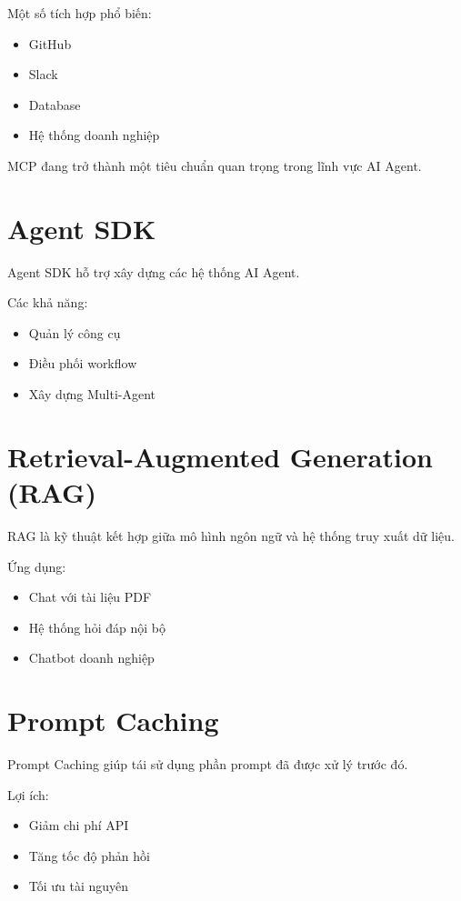 \documentclass[12pt]{article}
\begin{document}
Một số tích hợp phổ biến:

\begin{itemize}
    \item GitHub
    \item Slack
    \item Database
    \item Hệ thống doanh nghiệp
\end{itemize}

MCP đang trở thành một tiêu chuẩn quan trọng trong lĩnh vực AI Agent.

\section{Agent SDK}

Agent SDK hỗ trợ xây dựng các hệ thống AI Agent.

Các khả năng:

\begin{itemize}
    \item Quản lý công cụ
    \item Điều phối workflow
    \item Xây dựng Multi-Agent
\end{itemize}

\section{Retrieval-Augmented Generation (RAG)}

RAG là kỹ thuật kết hợp giữa mô hình ngôn ngữ và hệ thống truy xuất dữ liệu.

Ứng dụng:

\begin{itemize}
    \item Chat với tài liệu PDF
    \item Hệ thống hỏi đáp nội bộ
    \item Chatbot doanh nghiệp
\end{itemize}

\section{Prompt Caching}

Prompt Caching giúp tái sử dụng phần prompt đã được xử lý trước đó.

Lợi ích:

\begin{itemize}
    \item Giảm chi phí API
    \item Tăng tốc độ phản hồi
    \item Tối ưu tài nguyên
\end{itemize}
\end{document}
